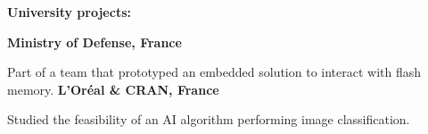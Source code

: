 \documentclass[10pt,a4paper,ragged2e]{altacv}
\begin{document}
\divider

\textbf{\large{University projects:}}

\smallskip
\small\textbf{Ministry of Defense, France}\hfill{}\hspace{5em}

\small{Part of a team that prototyped an embedded solution to interact with flash memory.}
\newline \smallskip
\textbf{L'Oréal \& CRAN, France}\hfill{}\hspace{5em}

\small{Studied the feasibility of an AI algorithm performing image classification.}

\clearpage








\end{document}
